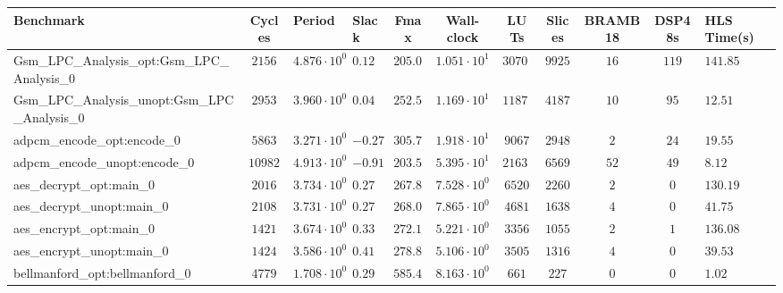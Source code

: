 \begin{tabular}{|l|c|HHc|c|c|c|c|cH|}
\hline
Benchmark                                       & Cycles       & Period                 & Slack     & Fmax       & Wall-clock              & LUTs       & Slices    & BRAMB18 & DSP48s  & HLS Time(s) \\
\hline
Gsm\_LPC\_Analysis\_opt:Gsm\_LPC\_Analysis\_0   & $ 2156     $ & $ 4.876 \cdot 10^{0} $ & $ 0.12  $ & $ 205.09 $ & $ 1.051 \cdot 10^{1}  $ & $ 30702  $ & $ 9925  $ & $ 16  $ & $ 119 $ & $ 141.85  $ \\
Gsm\_LPC\_Analysis\_unopt:Gsm\_LPC\_Analysis\_0 & $ 2953     $ & $ 3.960 \cdot 10^{0} $ & $ 0.04  $ & $ 252.53 $ & $ 1.169 \cdot 10^{1}  $ & $ 11875  $ & $ 4187  $ & $ 10  $ & $ 95  $ & $ 12.51   $ \\
adpcm\_encode\_opt:encode\_0                    & $ 5863     $ & $ 3.271 \cdot 10^{0} $ & $ -0.27 $ & $ 305.72 $ & $ 1.918 \cdot 10^{1}  $ & $ 9067   $ & $ 2948  $ & $ 2   $ & $ 24  $ & $ 19.55   $ \\
adpcm\_encode\_unopt:encode\_0                  & $ 10982    $ & $ 4.913 \cdot 10^{0} $ & $ -0.91 $ & $ 203.54 $ & $ 5.395 \cdot 10^{1}  $ & $ 21632  $ & $ 6569  $ & $ 52  $ & $ 49  $ & $ 8.12    $ \\
aes\_decrypt\_opt:main\_0                       & $ 2016     $ & $ 3.734 \cdot 10^{0} $ & $ 0.27  $ & $ 267.81 $ & $ 7.528 \cdot 10^{0}  $ & $ 6520   $ & $ 2260  $ & $ 2   $ & $ 0   $ & $ 130.19  $ \\
aes\_decrypt\_unopt:main\_0                     & $ 2108     $ & $ 3.731 \cdot 10^{0} $ & $ 0.27  $ & $ 268.02 $ & $ 7.865 \cdot 10^{0}  $ & $ 4681   $ & $ 1638  $ & $ 4   $ & $ 0   $ & $ 41.75   $ \\
aes\_encrypt\_opt:main\_0                       & $ 1421     $ & $ 3.674 \cdot 10^{0} $ & $ 0.33  $ & $ 272.18 $ & $ 5.221 \cdot 10^{0}  $ & $ 3356   $ & $ 1055  $ & $ 2   $ & $ 1   $ & $ 136.08  $ \\
aes\_encrypt\_unopt:main\_0                     & $ 1424     $ & $ 3.586 \cdot 10^{0} $ & $ 0.41  $ & $ 278.86 $ & $ 5.106 \cdot 10^{0}  $ & $ 3505   $ & $ 1316  $ & $ 4   $ & $ 0   $ & $ 39.53   $ \\
bellmanford\_opt:bellmanford\_0                 & $ 4779     $ & $ 1.708 \cdot 10^{0} $ & $ 0.29  $ & $ 585.48 $ & $ 8.163 \cdot 10^{0}  $ & $ 661    $ & $ 227   $ & $ 0   $ & $ 0   $ & $ 1.02    $ \\

\end{tabular}
